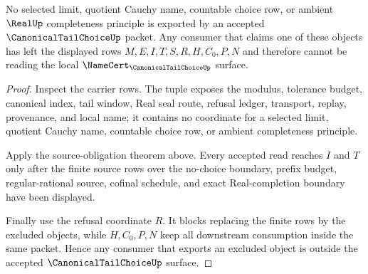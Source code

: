 \begin{theorem}
\label{thm:canonical-tail-choice-nonescape}
No selected limit, quotient Cauchy name, countable choice row, or ambient $\RealUp$ completeness principle is exported by an accepted $\CanonicalTailChoiceUp$ packet. Any consumer that claims one of these objects has left the displayed rows $M,E,I,T,S,R,H,C_0,P,N$ and therefore cannot be reading the local $\NameCert_{\CanonicalTailChoiceUp}$ surface.
\end{theorem}
\begin{proof}
Inspect the carrier rows. The tuple exposes the modulus, tolerance budget, canonical index, tail window, Real seal route, refusal ledger, transport, replay, provenance, and local name; it contains no coordinate for a selected limit, quotient Cauchy name, countable choice row, or ambient completeness principle.

Apply the source-obligation theorem above. Every accepted read reaches $I$ and $T$ only after the finite source rows over the no-choice boundary, prefix budget, regular-rational source, cofinal schedule, and exact Real-completion boundary have been displayed.

Finally use the refusal coordinate $R$. It blocks replacing the finite rows by the excluded objects, while $H,C_0,P,N$ keep all downstream consumption inside the same packet. Hence any consumer that exports an excluded object is outside the accepted $\CanonicalTailChoiceUp$ surface.
\end{proof}

